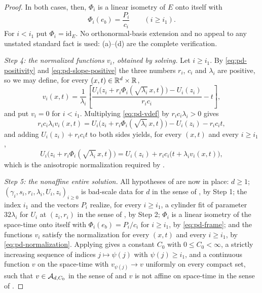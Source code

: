 \begin{proof}
In both cases, then, $\Phi_i$ is a linear isometry of $E$ onto itself with
\begin{equation}\label{eq:pd-frame}
  \Phi_i(e_b)=\frac{P_i}{c_i}\qquad(i\ge i_1).
\end{equation}
For $i<i_1$ put $\Phi_i=\mathrm{id}_E$. No orthonormal-basis extension and no
appeal to any unstated standard fact is used: (a)--(d) are the complete
verification.

\emph{Step 4: the normalized functions $v_i$, obtained by solving.}
Let $i\ge i_1$. By \eqref{eq:pd-positivity} and \eqref{eq:pd-slope-positive} the
three numbers $r_i$, $c_i$ and $\lambda_i$ are positive, so we may define, for
every $(x,t)\in\mathbb{R}^d\times\mathbb{R}$,
\begin{equation}\label{eq:pd-vdef}
  v_i(x,t)=\frac{1}{\lambda_i}
    \left[\frac{U_i\bigl(z_i+r_i\Phi_i(\sqrt{\lambda_i}\,x,t)\bigr)-U_i(z_i)}
               {r_ic_i}-t\right],
\end{equation}
and put $v_i=0$ for $i<i_1$. Multiplying \eqref{eq:pd-vdef} by
$r_ic_i\lambda_i>0$ gives
\[
  r_ic_i\lambda_iv_i(x,t)
   =U_i\bigl(z_i+r_i\Phi_i(\sqrt{\lambda_i}\,x,t)\bigr)-U_i(z_i)-r_ic_it ,
\]
and adding $U_i(z_i)+r_ic_it$ to both sides yields, for every $(x,t)$ and every
$i\ge i_1$,
\begin{equation}\label{eq:pd-normalization}
  U_i\bigl(z_i+r_i\Phi_i(\sqrt{\lambda_i}\,x,t)\bigr)
   =U_i(z_i)+r_ic_i\bigl(t+\lambda_iv_i(x,t)\bigr),
\end{equation}
which is the anisotropic normalization required by .

\emph{Step 5: the nonaffine entire solution.}
All hypotheses of  are now in place: $d\ge1$;
$(\gamma_i,s_i,r_i,\lambda_i,U_i,z_i)_{i\ge0}$ is bad-scale data for $d$ in the
sense of , by Step 1; the index $i_1$ and the vectors
$P_i$ realize, for every $i\ge i_1$, a cylinder fit of parameter $32\lambda_i$
for $U_i$ at $(z_i,r_i)$ in the sense of , by Step 2;
$\Phi_i$ is a linear isometry of the space-time onto itself with
$\Phi_i(e_b)=P_i/c_i$ for $i\ge i_1$, by \eqref{eq:pd-frame}; and the functions
$v_i$ satisfy the normalization for every $(x,t)$ and every $i\ge i_1$, by
\eqref{eq:pd-normalization}. Applying  gives a constant
$C_0$ with $0\le C_0<\infty$, a strictly increasing sequence of indices
$j\mapsto\psi(j)$ with $\psi(j)\ge i_1$, and a continuous function $v$ on the
space-time with $v_{\psi(j)}\to v$ uniformly on every compact set, such that
$v\in\mathcal{A}_{d,C_0}$ in the sense of  and $v$ is not affine
on space-time in the sense of .


\end{proof}
